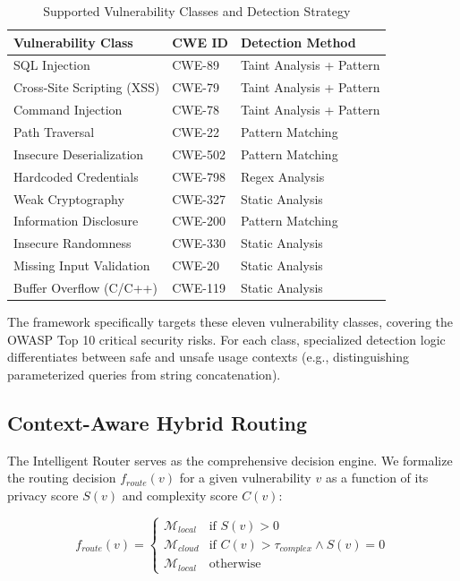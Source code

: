 \documentclass[conference]{IEEEtran}
\begin{document}
\begin{table}[h]
\centering
\caption{Supported Vulnerability Classes and Detection Strategy}
\label{tab:vuln_classes}
\begin{tabular}{lll}
\toprule
\textbf{Vulnerability Class} & \textbf{CWE ID} & \textbf{Detection Method} \\
\midrule
SQL Injection & CWE-89 & Taint Analysis + Pattern \\
Cross-Site Scripting (XSS) & CWE-79 & Taint Analysis + Pattern \\
Command Injection & CWE-78 & Taint Analysis + Pattern \\
Path Traversal & CWE-22 & Pattern Matching \\
Insecure Deserialization & CWE-502 & Pattern Matching \\
Hardcoded Credentials & CWE-798 & Regex Analysis \\
Weak Cryptography & CWE-327 & Static Analysis \\
Information Disclosure & CWE-200 & Pattern Matching \\
Insecure Randomness & CWE-330 & Static Analysis \\
Missing Input Validation & CWE-20 & Static Analysis \\
Buffer Overflow (C/C++) & CWE-119 & Static Analysis \\
\bottomrule
\end{tabular}
\end{table}

The framework specifically targets these eleven vulnerability classes, covering the OWASP Top 10 critical security risks. For each class, specialized detection logic differentiates between safe and unsafe usage contexts (e.g., distinguishing parameterized queries from string concatenation).

\subsection{Context-Aware Hybrid Routing}
The Intelligent Router serves as the comprehensive decision engine. We formalize the routing decision $f_{route}(v)$ for a given vulnerability $v$ as a function of its privacy score $S(v)$ and complexity score $C(v)$:

\begin{equation}
    f_{route}(v) = 
    \begin{cases} 
      \mathcal{M}_{local} & \text{if } S(v) > 0 \\
      \mathcal{M}_{cloud} & \text{if } C(v) > \tau_{complex} \land S(v) = 0 \\
      \mathcal{M}_{local} & \text{otherwise}
   \end{cases}
\end{equation}
\end{document}
